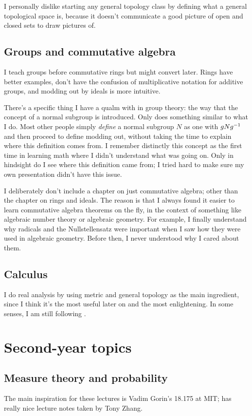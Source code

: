 I personally dislike starting any general topology class
by defining what a general topological space is,
because it doesn't communicate a good picture of open and closed sets
to draw pictures of.

\subsection{Groups and commutative algebra}
I teach groups before commutative rings but might convert later.
Rings have better examples, don't have the confusion of multiplicative
notation for additive groups, and modding out by ideals is more intuitive.

There's a specific thing I have a qualm with in group theory:
the way that the concept of a normal subgroup is introduced.
Only \cite{ref:gowers} does something similar to what I do.
Most other people simply \emph{define} a normal subgroup $N$
as one with $gNg^{-1}$ and then proceed to define modding out,
without taking the time to explain where this definition comes from.
I remember distinctly this concept as the first time in learning math
where I didn't understand what was going on.
Only in hindsight do I see where this definition came from;
I tried hard to make sure my own presentation didn't have this issue.

I deliberately don't include a chapter on just commutative algebra;
other than the chapter on rings and ideals.
The reason is that I always found it easier to learn
commutative algebra theorems on the fly,
in the context of something like algebraic number theory or algebraic geometry.
For example, I finally understand why radicals and the Nullstellensatz were important
when I saw how they were used in algebraic geometry.
Before then, I never understood why I cared about them.

\subsection{Calculus}
I do real analysis by using metric and general topology
as the main ingredient, since I think it's the most useful
later on and the most enlightening.
In some senses, I am still following \cite{ref:pugh}.

\section{Second-year topics}
\subsection{Measure theory and probability}
The main inspiration for these lectures is
Vadim Gorin's 18.175 at MIT;
\cite{ref:gorin} has really nice lecture notes taken by Tony Zhang.

